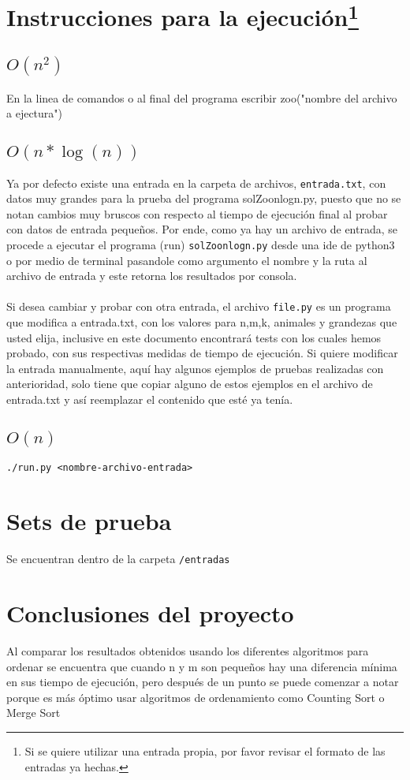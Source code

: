\documentclass{article}
\begin{document}
		\section[title]{Instrucciones para la ejecución\footnote{Si se quiere utilizar una entrada propia, por favor revisar el formato de las entradas ya hechas.}}
		\subsection{$O(n^2)$}
		En la linea de comandos o al final del programa escribir zoo("nombre del archivo a ejectura")
		\subsection{$O(n*\log(n))$}		
		Ya por defecto existe una entrada en la carpeta de archivos, \texttt{entrada.txt}, con datos muy grandes para la prueba del programa solZoonlogn.py, puesto que no se notan cambios muy bruscos con respecto al tiempo de ejecución final al probar con datos de entrada pequeños. 
		Por ende, como ya hay un archivo de entrada, se procede a ejecutar el programa (run) \texttt{solZoonlogn.py} desde una ide de python3 o por medio de terminal pasandole como argumento el nombre y la ruta al archivo de entrada y este retorna los resultados por consola.\\\\
		Si desea cambiar y probar con otra entrada, el archivo \texttt{file.py} es un programa que modifica a entrada.txt, con los valores para n,m,k, animales y grandezas que usted elija, inclusive en este documento encontrará tests con los cuales hemos probado, con sus respectivas medidas de tiempo de ejecución. Si quiere modificar la entrada manualmente, aquí hay algunos ejemplos de pruebas realizadas con anterioridad, solo tiene que copiar alguno de estos ejemplos en el archivo de entrada.txt y así reemplazar el contenido que esté ya tenía.
		\subsection{$O(n)$}
			\texttt{./run.py <nombre-archivo-entrada>}
	\section{Sets de prueba}
		Se encuentran dentro de la carpeta \texttt{/entradas}
	\section{Conclusiones del proyecto}
Al comparar los resultados obtenidos usando los diferentes algoritmos para ordenar se encuentra que cuando n y m son pequeños hay una diferencia mínima en sus tiempo de ejecución, pero después de un punto se puede comenzar a notar porque es más óptimo usar algoritmos de ordenamiento como Counting Sort  o Merge Sort 
\end{document}

